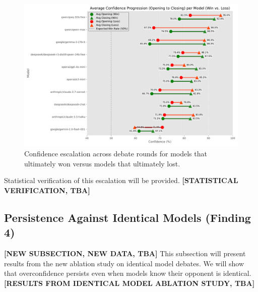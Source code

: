 \documentclass{article}
\begin{document}
\begin{figure}[h]
  \centering
  \includegraphics[width=0.9\linewidth]{figures/model_win_loss_escalation_dumbell.pdf}
  \caption{Confidence escalation across debate rounds for models that ultimately won versus models that ultimately lost.}
  \label{fig:confidence_trend_winner_loser}
\end{figure}

Statistical verification of this escalation will be provided. \textbf{[STATISTICAL VERIFICATION, TBA]}

\subsection{Persistence Against Identical Models (Finding 4)}
\textbf{[NEW SUBSECTION, NEW DATA, TBA]}
This subsection will present results from the new ablation study on identical model debates. We will show that overconfidence persists even when models know their opponent is identical. \textbf{[RESULTS FROM IDENTICAL MODEL ABLATION STUDY, TBA]}
\end{document}
